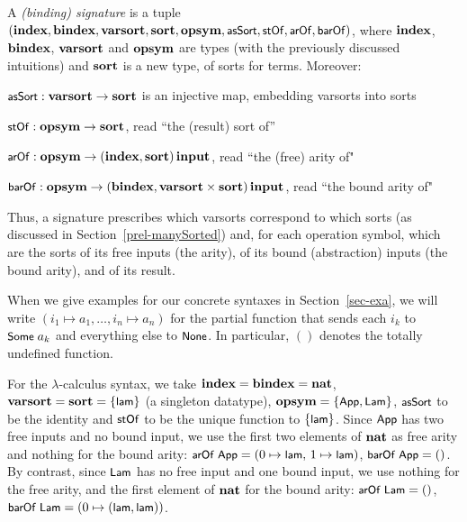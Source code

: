 \documentclass{llncs}
\newenvironment{myitem}[1][]
  {\itemize[leftmargin=*,topsep=0.3ex,itemsep=1pt, #1]}
  {\enditemize}
\begin{document}
%

A {\em (binding) signature} is a tuple
%
$(\indexx,\bindexx,\varsort,\sort,\opsym,\asSort,\stOf,\arOf,\allowbreak\barOf)$, 
%
where $\indexx$, $\bindexx$, $\varsort$ and $\opsym$ are types (with the previously discussed intuitions) and 
$\sort$ is a new type, of sorts for terms. Moreover: 
\begin{myitem}
\item $\asSort : \varsort \ra \sort$ is an injective map, embedding varsorts into sorts
\item $\stOf : \opsym \ra \sort$, read ``the (result) sort of''
\item $\arOf : \opsym \ra (\indexx,\sort)\,\inputt$, read ``the (free) arity of"
\item $\barOf : \opsym \ra (\bindexx,\varsort \times \sort)\,\inputt$, read ``the bound arity of" %
\end{myitem}

Thus, %
a signature prescribes which varsorts correspond to which sorts (as discussed in Section~\ref{prel-manySorted}) 
and, for each operation symbol, 
which are the sorts of its free inputs (the arity), of its bound (abstraction) inputs (the bound arity),  
and of its result.

When we give examples for our concrete syntaxes in Section~\ref{sec-exa}, 
we will write $(i_1\mapsto a_1,\ldots,i_n\mapsto a_n)$ for the partial 
function that sends each $i_k$ to $\Some\;a_k$ and everything else to $\None$. In particular, $()$ 
denotes the totally undefined function. 

For the $\lambda$-calculus syntax, we take $\indexx = \bindexx = \nat$, $\varsort = \sort = \{\lamterm\}$ (a singleton datatype), 
$\opsym = \{\App,\Lam\}$, %
$\asSort$ to be the identity and $\stOf$ to be the unique function to $\{\lamterm\}$. 
Since $\App$ has two free inputs and no bound input, we use the first two elements of $\nat$ as free arity 
and nothing for the 
bound arity:
$\arOf\;\App =(0\mapsto \lamterm,\,1\mapsto\lamterm)$, 
$\barOf\;\App = ()$. 
%
By contrast, since $\Lam$ has no free input and one bound input, we use nothing for the 
free arity, and the first element of $\nat$ for the bound arity: 
$\arOf\;\Lam = ()$, 
$\barOf\;\Lam = (0\mapsto (\lamterm,\lamterm))$. 
\end{document}
